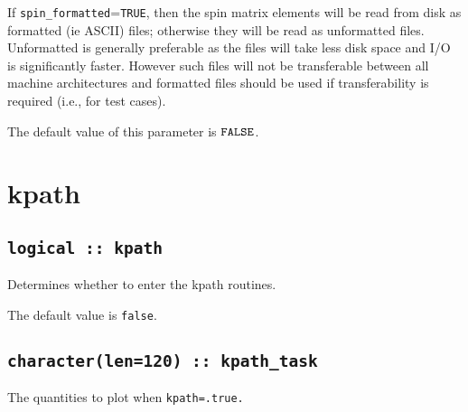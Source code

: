If \verb#spin_formatted#=\verb#TRUE#, then the spin matrix elements will be
read from disk as formatted (ie ASCII) files; otherwise they will be
read as unformatted files. Unformatted is generally preferable as the
files will take less disk space and I/O is significantly
faster. However such files will not be transferable between all
machine architectures and formatted files should be used if
transferability is required (i.e., for test cases).

The default value of this parameter is $\verb#FALSE#$.


\clearpage
\section{kpath}

\subsection[berry]{\tt logical :: kpath}
Determines whether to enter the kpath routines.

The default value is \verb#false#.


\subsection[kpath\_task]{\tt character(len=120) ::  kpath\_task} 
The quantities to plot when {\tt kpath=.true.} 

